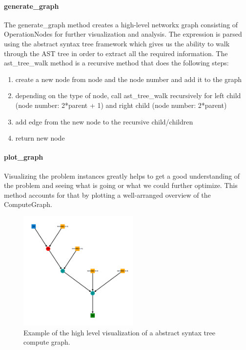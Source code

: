 \paragraph{generate\_graph}
The generate\_graph method creates a high-level networkx graph consisting of OperationNodes for further visualization and analysis. The expression is parsed using the abstract syntax tree framework which gives us the ability to walk through the AST tree in order to extract all the required information.
The ast\_tree\_walk method is a recursive method that does the following steps:
\begin{enumerate}
	\item create a new node from node and the node number and add it to the graph
	\item depending on the type of node, call ast\_tree\_walk recursively for left child (node number: 2*parent + 1) and right child (node number: 2*parent)
	\item add edge from the new node to the recursive 
	child/children
	\item return new node
\end{enumerate}


\paragraph{plot\_graph}
Visualizing the problem instances greatly helps to get a good understanding of the problem and seeing what is going or what we could further optimize. This method accounts for that by plotting a well-arranged overview of the ComputeGraph. 
\begin{figure}[h]
	\centering
	\includegraphics[height=16em]{images/compute-graph-debugging-example.png}
	\caption{Example of the high level visualization of a abstract syntax tree compute graph.}
	\label{fig:compute-graph-debugging-example}
\end{figure}


